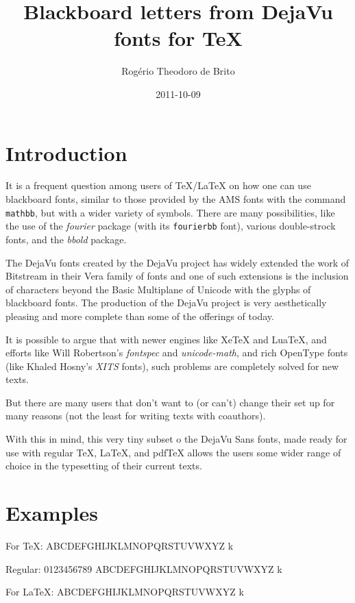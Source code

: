 \documentclass[11pt]{article}
\title{Blackboard letters from DejaVu fonts for \TeX}
\author{Rogério Theodoro de Brito}
\date{2011-10-09}
\newcommand{\showcase}{0123456789 ABCDEFGHIJKLMNOPQRSTUVWXYZ k}
\begin{document}
\maketitle
\section{Introduction}

It is a frequent question among users of \TeX/\LaTeX{} on how one can use
blackboard fonts, similar to those provided by the AMS fonts with the
command \texttt{mathbb}, but with a wider variety of symbols. There are many
possibilities, like the use of the \emph{fourier} package (with its
\texttt{fourierbb} font), various double-strock fonts, and the \emph{bbold}
package.

The DejaVu fonts created by the DejaVu project has widely extended the work
of Bitstream in their Vera family of fonts and one of such extensions is the
inclusion of characters beyond the Basic Multiplane of Unicode with the
glyphs of blackboard fonts. The production of the DejaVu project is very
aesthetically pleasing and more complete than some of the offerings of
today.

It is possible to argue that with newer engines like Xe\TeX{} and Lua\TeX,
and efforts like Will Robertson's \emph{fontspec} and \emph{unicode-math},
and rich OpenType fonts (like Khaled Hosny's \emph{XITS} fonts), such
problems are completely solved for new texts.

But there are many users that don't want to (or can't) change their set up
for many reasons (not the least for writing texts with coauthors).

With this in mind, this very tiny subset o the DejaVu Sans fonts, made ready
for use with regular \TeX, \LaTeX, and pdf\TeX{} allows the users some wider
range of choice in the typesetting of their current texts.

\section{Examples}

For \TeX: {\blackboardfont \showcase}

Regular: \showcase

For \LaTeX: {\bbold \showcase}
\end{document}

